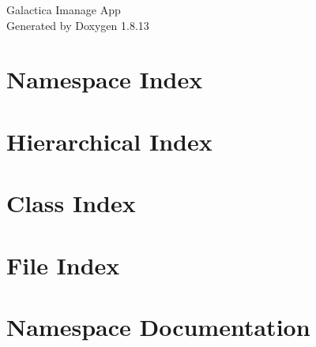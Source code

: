 \documentclass[twoside]{book}
\newcommand{\+}{\discretionary{\mbox{\scriptsize$\hookleftarrow$}}{}{}}
\newcommand{\clearemptydoublepage}{%
  \newpage{\pagestyle{empty}\cleardoublepage}%
}
\begin{document}
\hypersetup{pageanchor=false,
             bookmarksnumbered=true,
             pdfencoding=unicode
            }
\begin{titlepage}
\vspace*{7cm}
\begin{center}%
{\Large Galactica Imanage App }\\
\vspace*{1cm}
{\large Generated by Doxygen 1.8.13}\\
\end{center}
\end{titlepage}
\clearemptydoublepage
{}
\tableofcontents
\clearemptydoublepage
{}
\hypersetup{pageanchor=true}

\chapter{Namespace Index}

\chapter{Hierarchical Index}

\chapter{Class Index}

\chapter{File Index}

\chapter{Namespace Documentation}






























\end{document}
